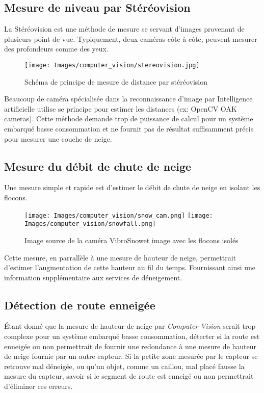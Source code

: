 \subsection{Mesure de niveau par Stéréovision}
La Stéréovision est une méthode de mesure se servant d'images provenant de plusieurs point de vue.
Typiquement, deux caméras côte à côte, peuvent mesurer des profondeurs comme des yeux.

\begin{figure}[H]
    \centering
    \texttt{[image: Images/computer\_vision/stereovision.jpg]}
    \caption[Schéma de principe stéréovision]{Schéma de principe de mesure de distance par stéréovision}
    \label{fig:Stereovision}
\end{figure}
\noindent
Beaucoup de caméra spécialisée dans la reconnaissance d'image par Intelligence artificielle utilise se principe
pour estimer les distances (ex: OpenCV OAK cameras).
Cette méthode demande trop de puissance de calcul pour un système embarqué basse consommation et ne fournit
pas de résultat suffisamment précis pour mesurer une couche de neige.
\newpage

\subsection{Mesure du débit de chute de neige}
Une mesure simple et rapide est d'estimer le débit de chute de neige en isolant les flocons.
\begin{figure}[H]
    \centering
    \texttt{[image: Images/computer\_vision/snow\_cam.png]}
    \texttt{[image: Images/computer\_vision/snowfall.png]}
    \caption[Comparaison image source et bruit sur image]{Image source de la caméra VibroSnow\footnotemark[1] et image avec les flocons isolés}
    \label{fig:Snowfall}
\end{figure}
\noindent
Cette mesure, en parrallèle à une mesure de hauteur de neige, permettrait d'estimer 
l'augmentation de cette hauteur au fil du temps. Fournissant ainsi une information supplémentaire
aux services de déneigement.

\subsection{Détection de route enneigée}
Étant donné que la mesure de hauteur de neige par \emph{Computer Vision} serait trop complexe
pour un système embarqué basse consommation, détecter si la route est enneigée ou non
permettrait de fournir une redondance à une mesure de hauteur de neige fournie par un autre capteur.
Si la petite zone mesurée par le capteur se retrouve mal déneigée, ou qu'un objet, comme un caillou, mal placé
fausse la mesure du capteur, savoir si le segment de route est enneigé ou non permettrait d'éliminer ces erreurs.

